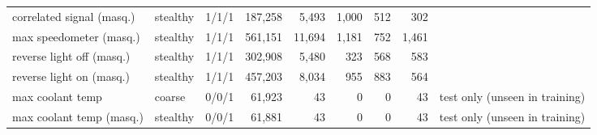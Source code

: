 \begin{table}[t]
\begin{tabular}{@{}llrrrrrrl@{}}
correlated signal (masq.) & stealthy & 1/1/1 & 187,258 & 5,493 & 1,000 & 512 & 302 &  \\
max speedometer (masq.) & stealthy & 1/1/1 & 561,151 & 11,694 & 1,181 & 752 & 1,461 &  \\
reverse light off (masq.) & stealthy & 1/1/1 & 302,908 & 5,480 & 323 & 568 & 583 &  \\
reverse light on (masq.) & stealthy & 1/1/1 & 457,203 & 8,034 & 955 & 883 & 564 &  \\
max coolant temp & coarse & 0/0/1 & 61,923 & 43 & 0 & 0 & 43 & test only (unseen in training) \\
max coolant temp (masq.) & stealthy & 0/0/1 & 61,881 & 43 & 0 & 0 & 43 & test only (unseen in training) \\
\bottomrule
\end{tabular}
\end{table}

